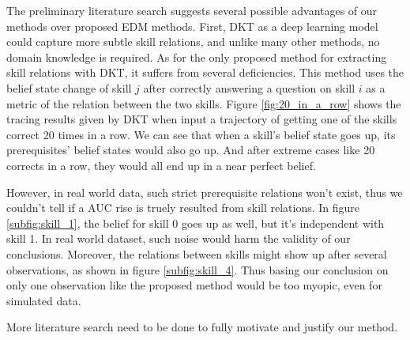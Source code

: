 The preliminary literature search suggests several possible advantages of our methods over proposed EDM methods. First, DKT as a deep learning model could capture more subtle skill relations, and unlike many other methods, no domain knowledge is required. As for the only proposed method for extracting skill relations with DKT, it suffers from several deficiencies. This method uses the belief state change of skill $j$ after correctly answering a question on skill $i$ as a metric of the relation between the two skills. Figure \ref{fig:20_in_a_row} shows the tracing results given by DKT when input a trajectory of getting one of the skills correct 20 times in a row. We can see that when a skill's belief state goes up, its prerequisites' belief states would also go up. And after extreme cases like 20 corrects in a row, they would all end up in a near perfect belief.

However, in real world data, such strict prerequisite relations won't exist, thus we couldn't tell if a AUC rise is truely resulted from skill relations. In figure \ref{subfig:skill_1}, the belief for skill 0 goes up as well, but it's independent with skill 1. In real world dataset, such noise would harm the validity of our conclusions. Moreover, the relations between skills might show up after several observations, as shown in figure \ref{subfig:skill_4}. Thus basing our conclusion on only one observation like the proposed method would be too myopic, even for simulated data.

More literature search need to be done to fully motivate and justify our method.

